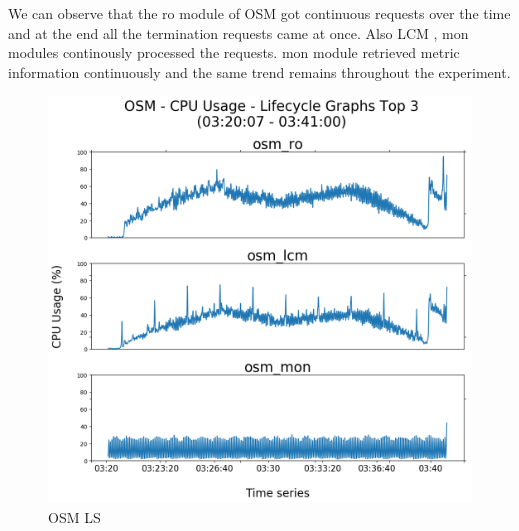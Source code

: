 We can observe that the ro module of OSM got continuous requests over the time and at the end all the termination requests came at once. Also LCM , mon modules continously processed the requests. mon module retrieved metric information continuously and the same trend
remains throughout the experiment.

\begin{figure}[h]
	\centering
	\includegraphics[width=0.7\linewidth]{figures/scalability_graphs/Lifecycle-Graphs-Top-3/OSM-TOP-3-Lifecycle}
	\caption{OSM LS}
	\label{fig:osm-top-3-lifecycle}
\end{figure}
